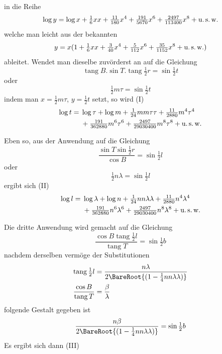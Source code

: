 %
in die Reihe
\[
\log y=\log x+\tfrac16xx+\tfrac{11}{180}x^4+\tfrac{191}{5670}x^6+\tfrac{2497}{113400}x^8+\text{u.\,s.\,w.}
\]
welche man leicht aus der bekannten
\[
y=x(1+\tfrac16xx+\tfrac3{40}x^4+\tfrac5{112}x^6+\tfrac{35}{1152}x^8+\text{u.\,s.\,w.})
\]
ableitet. Wendet man dieselbe zuvörderst an auf die Gleichung
\[
\operatorname{tang}B\mathord{.}\sin T\mathord{.}\operatorname{tang}\tfrac12r=\sin\tfrac12t
\]
oder
\[
\tfrac12m\tau=\sin\tfrac12t
\]
indem man \(x=\frac12m\tau\), \(y=\frac12t\) setzt, so wird (I)
\[
\begin{aligned}
\log t={}&\log\tau+\log m+\tfrac1{24}mm\tau\tau+\tfrac{11}{2880}m^4\tau^4\\
&+\tfrac{191}{362880}m^6\tau^6+\tfrac{2497}{29030400}m^8\tau^8+\text{u.\,s.\,w.}
\end{aligned}
\]

\indent Eben so, aus der Anwendung auf die Gleichung
\[
\frac{\sin T\sin\frac12r}{\cos B}=\sin\tfrac12l
\]
oder
\[
\tfrac12n\lambda=\sin\tfrac12l
\]
ergibt sich (II)
\[
\begin{aligned}
\log l={}&\log\lambda+\log n+\tfrac1{24}nn\lambda\lambda+\tfrac{11}{2880}n^4\lambda^4\\
&+\tfrac{191}{362880}n^6\lambda^6+\tfrac{2497}{29030400}n^8\lambda^8+\text{u.\,s.\,w.}
\end{aligned}
\]

\indent Die dritte Anwendung wird gemacht auf die Gleichung
\[
\frac{\cos B\operatorname{tang}\frac12l}{\operatorname{tang}T}=\sin\tfrac12b
\]
nachdem derselben vermöge der Substitutionen
\[
\begin{aligned}
\operatorname{tang}\tfrac12l&=\frac{n\lambda}{2\BareRoot{(1-\frac14nn\lambda\lambda)}}\\
\frac{\cos B}{\operatorname{tang}T}&=\frac\beta\lambda
\end{aligned}
\]
folgende Gestalt gegeben ist
\[
\frac{n\beta}{2\BareRoot{(1-\frac14nn\lambda\lambda)}}=\sin\tfrac12b
\]
Es ergibt sich dann (III)
